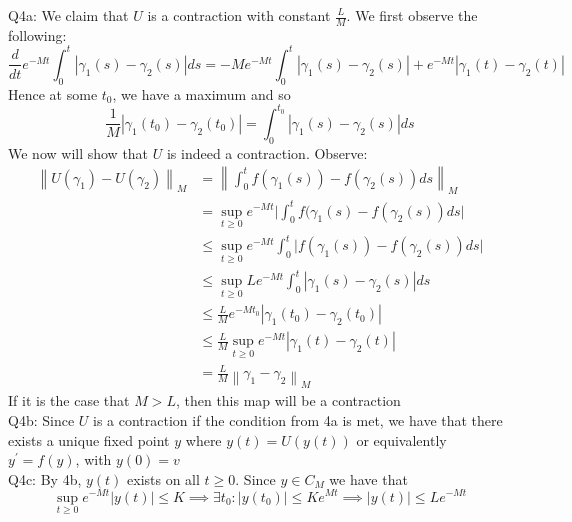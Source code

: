 \documentclass[letterpaper]{article}
\newcommand{\norm}[1]{\left\lVert#1\right\rVert}
\begin{document}
\noindent Q4a: We claim that $U$ is a contraction with constant $\frac{L}{M}$. We first observe the following: 
    $$\frac{d}{dt} e^{-Mt}\int_0^t|\gamma_1(s)-\gamma_2(s) |ds  = -M e^{-Mt} \int_{0}^t |\gamma_1(s) -\gamma_2(s) | + e^{-Mt} |\gamma_1(t) -\gamma_2(t)| $$
Hence at some $t_0$, we have a maximum and so $$\frac{1}{M} |\gamma_1(t_0) -\gamma_2(t_0)| = \int_{0}^{t_0} |\gamma_1(s) - \gamma_2(s)| ds$$
\newline We now will show that $U$ is indeed a contraction. Observe: 
\begin{align*} 
    \norm{U(\gamma_1)-U(\gamma_2)}_M & = \norm{\int_{0}^t f(\gamma_1(s)) - f(\gamma_2(s))ds}_M
    \\ & = \sup_{t\geq 0} e^{-Mt} \Big|\int_{0}^t f(\gamma_1(s) -f(\gamma_2(s)) ds \Big|
    \\ & \leq \sup_{t\geq 0} e^{-Mt} \int_{0}^t \Big| f(\gamma_1(s)) -f(\gamma_2(s)) ds\Big|
    \\ & \leq \sup_{t\geq 0} L e^{-Mt} \int_{0}^t |\gamma_1(s)-\gamma_2(s) |ds \tag{by Lipschitz}
    \\ & \leq \frac{L}{M} e^{-Mt_0} |\gamma_1(t_0) - \gamma_2(t_0)|
    \\ & \leq \frac{L}{M} \sup_{t\geq 0} e^{-Mt} |\gamma_1(t) -\gamma_2(t)|
    \\ & = \frac{L}{M} \norm{\gamma_1-\gamma_2}_M
\end{align*}
If it is the case that $M>L$, then this map will be a contraction
\newline \\ Q4b: Since $U$ is a contraction if the condition from 4a is met, we have that there exists a unique fixed point $y$ where $y(t) = U(y(t))$ or equivalently $y^\prime = f(y) $, with $y(0)=v$
\newline \\ Q4c: By 4b, $y(t)$ exists on all $t \geq 0$. Since $y\in C_M$ we have that
$$\sup_{t\geq 0}e^{-Mt} |y(t)| \leq K \implies \exists t_0: |y(t_0)| \leq K e^{Mt} \implies |y(t)| \leq Le^{-Mt}$$
\end{document}
